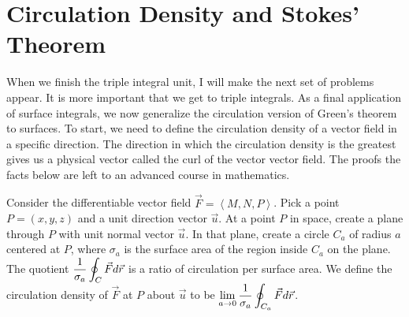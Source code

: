

\section{Circulation Density and Stokes' Theorem}

When we finish the triple integral unit, I will make the next set of problems appear. It is more important that we get to triple integrals.
As a final application of surface integrals, we now generalize the circulation version of Green's theorem to surfaces.  To start, we need to define the circulation density of a vector field in a specific direction. The direction in which the circulation density is the greatest gives us a physical vector called the curl of the vector vector field.  The proofs the facts below are left to an advanced course in mathematics. 

\begin{definition}
Consider the differentiable vector field $\vec F = \left<M,N,P\right>$. Pick a point $P=(x,y,z)$ and a unit direction vector $\vec u$.  
At a point $P$ in space, create a plane through $P$ with unit normal vector $\vec u$.  In that plane, create a circle $C_a$ of radius $a$ centered at $P$, where $\sigma_a$ is the surface area of the region inside $C_a$ on the plane. The quotient $\displaystyle\frac{1}{\sigma_a}\oint_C \vec F d\vec r$ is a ratio of circulation per surface area.  We define the circulation density of $\vec F$ at $P$ about $\vec u$ to be  $\displaystyle \lim_{a\to 0} \frac{1}{\sigma_a}\oint_{C_a} \vec F d\vec r$.  
\end{definition}

